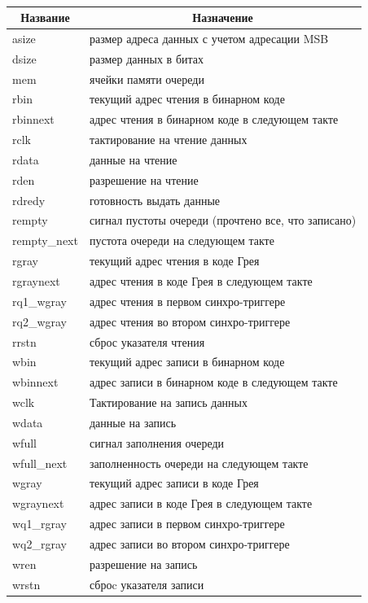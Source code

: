 \begin{table}[htbp]
	\caption{}
	\centering
	\fontsize{12}{16pt}\selectfont
	\begin{tabular}{|l|l|}
		\hline
		\multicolumn{1}{|c}{\textbf{Название}} & \multicolumn{1}{|c|}{\textbf{Назначение}} \\ \hline
		asize  &  размер адреса данных с учетом адресации MSB \\ \hline
		dsize  &  размер данных в битах \\ \hline
		mem  &  ячейки памяти очереди \\ \hline
		rbin  &  текущий адрес чтения в бинарном коде \\ \hline
		rbinnext  &  адрес чтения в бинарном коде в следующем такте \\ \hline
		rclk  &  тактирование на чтение данных \\ \hline
		rdata  &  данные на чтение \\ \hline
		rden  &  разрешение на чтение \\ \hline
		rdredy  &  готовность выдать данные \\ \hline
		rempty  &  сигнал пустоты очереди (прочтено все, что записано) \\ \hline
		rempty\_next  &  пустота очереди на следующем такте \\ \hline
		rgray  &  текущий адрес чтения в коде Грея \\ \hline
		rgraynext  &  адрес чтения в коде Грея в следующем такте \\ \hline
		rq1\_wgray  &  адрес чтения в первом синхро-триггере \\ \hline
		rq2\_wgray  &  адрес чтения во втором синхро-триггере \\ \hline
		rrstn  &  сброс указателя чтения \\ \hline
		wbin  &  текущий адрес записи в бинарном коде \\ \hline
		wbinnext  &  адрес записи в бинарном коде в следующем такте \\ \hline
		wclk  &  Тактирование на запись данных \\ \hline
		wdata  &  данные на запись \\ \hline
		wfull  &  сигнал заполнения очереди \\ \hline
		wfull\_next  &  заполненность очереди на следующем такте \\ \hline
		wgray  &  текущий адрес записи в коде Грея \\ \hline
		wgraynext  &  адрес записи в коде Грея в следующем такте \\ \hline
		wq1\_rgray  &  адрес записи в первом синхро-триггере \\ \hline
		wq2\_rgray  &  адрес записи во втором синхро-триггере \\ \hline
		wren  &  разрешение на запись \\ \hline
		wrstn  &  сброc указателя записи \\ \hline
	\end{tabular}
	\label{}
\end{table}





\clearpage